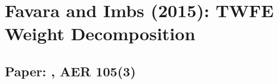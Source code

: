 \documentclass[12pt]{article}
\begin{document}
\section*{Favara and Imbs (2015): TWFE Weight Decomposition}
\subsection*{Paper: , AER 105(3)}




\end{document}
